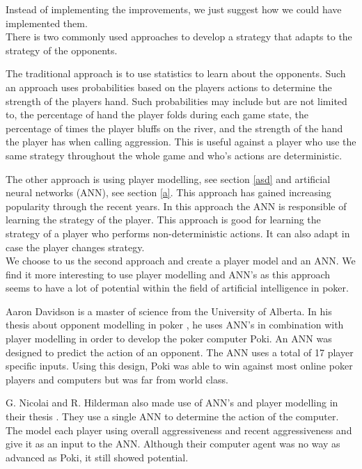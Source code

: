 Instead of implementing the improvements, we just suggest how we could have implemented them.\\

There is two commonly used approaches to develop a strategy that adapts to the strategy of the opponents.

The traditional approach is to use statistics to learn about the opponents. Such an approach uses probabilities based on the players actions to determine the strength of the players hand. Such probabilities may include but are not limited to, the percentage of hand the player folds during each game state, the percentage of times the player bluffs on the river, and the strength of the hand the player has when calling aggression. This is useful against a player who use the same strategy throughout the whole game and who's actions are deterministic.

The other approach is using player modelling, see section \ref{asd} and artificial neural networks (ANN), see section \ref{a}. This approach has gained increasing popularity through the recent years. In this approach the ANN is responsible of learning the strategy of the player. This approach is good for learning the strategy of a player who performs non-deterministic actions. It can also adapt in case the player changes strategy.\\

We choose to us the second approach and create a player model and an ANN. We find it more interesting to use player modelling and ANN's as this approach seems to have a lot of potential within the field of artificial intelligence in poker.

Aaron Davidson is a master of science from the University of Alberta. In his thesis about opponent modelling in poker \cite{opp-mod}, he uses ANN's in combination with player modelling in order to develop the poker computer Poki. An ANN was designed to predict the action of an opponent. The ANN uses a total of 17 player specific inputs. Using this design, Poki was able to win against most online poker players and computers but was far from world class.

G. Nicolai and R. Hilderman also made use of ANN's and player modelling in their thesis \cite{poker-agents}. They use a single ANN to determine the action of the computer. The model each player using overall aggressiveness and recent aggressiveness and give it as an input to the ANN. Although their computer agent was no way as advanced as Poki, it still showed potential.

